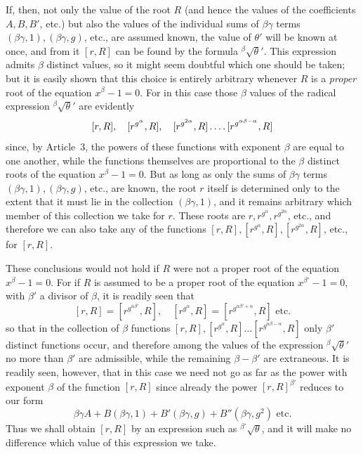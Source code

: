 If, then, not only the value of the root $R$ (and hence the values of the coefficients $A,B,B'$, etc.) but also the values of the individual sums of $\beta\gamma$ terms $(\beta\gamma,1),(\beta\gamma,g)$, etc., are assumed known, the value of $\theta'$ will be known at once, and from it $[r,R]$ can be found by the formula ${}^{\beta}\!\surd\theta'$. This expression admits $\beta$ distinct values, so it might seem doubtful which one should be taken; but it is easily shown that this choice is entirely arbitrary whenever $R$ is a \emph{proper} root of the equation $x^\beta-1=0$. For in this case those $\beta$ values of the radical expression ${}^{\beta}\!\surd\theta'$ are evidently
\[
[r,R],\quad[r^{g^\alpha},R],\quad[r^{g^{2\alpha}},R]\mathinner{.\,.\,.\,.}[r^{g^{\alpha\beta-\alpha}},R]
\]
since, by Article~3, the powers of these functions with exponent $\beta$ are equal to one another, while the functions themselves are proportional to the $\beta$ distinct roots of the equation $x^\beta-1=0$. But as long as only the sums of $\beta\gamma$ terms $(\beta\gamma,1),(\beta\gamma,g)$, etc., are known, the root $r$ itself is determined only to the extent that it must lie in the collection $(\beta\gamma,1)$, and it remains arbitrary which member of this collection we take for $r$. These roots are $r,r^{g^\alpha},r^{g^{2\alpha}}$, etc., and therefore we can also take any of the functions $[r,R],[r^{g^\alpha},R],[r^{g^{2\alpha}},R]$, etc., for $[r,R]$.

These conclusions would not hold if $R$ were not a proper root of the equation $x^\beta-1=0$. For if $R$ is assumed to be a proper root of the equation $x^{\beta'}-1=0$, with $\beta'$ a divisor of $\beta$, it is readily seen that
\[
[r,R]=[r^{g^{\alpha\beta'}},R],\quad[r^{g^\alpha},R]=[r^{g^{\alpha\beta'+\alpha}},R]\text{ etc.}
\]
so that in the collection of $\beta$ functions $[r,R],[r^{g^\alpha},R]\ldots[r^{g^{\alpha\beta-\alpha}},R]$ only $\beta'$ distinct functions occur, and therefore among the values of the expression ${}^{\beta}\!\surd\theta'$ no more than $\beta'$ are admissible, while the remaining $\beta-\beta'$ are extraneous. It is readily seen, however, that in this case we need not go as far as the power with exponent $\beta$ of the function $[r,R]$
since already the power $[r,R]^{\beta'}$ reduces to our form
\[
\beta\gamma A+B(\beta\gamma,1)+B'(\beta\gamma,g)+B''(\beta\gamma,g^2)\text{ etc.}
\]
Thus we shall obtain $[r,R]$ by an expression such as ${}^{\beta'}\!\surd\theta$, and it will make no difference which value of this expression we take.

